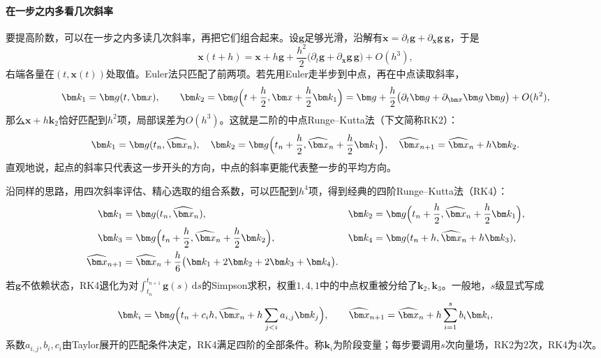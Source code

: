 \paragraph{在一步之内多看几次斜率}
要提高阶数，可以在一步之内多读几次斜率，再把它们组合起来。设$\bm g$足够光滑，沿解有$\ddot{\bm x}=\partial_t\bm g+\partial_{\bm x}\bm g\,\bm g$，于是
\[
  \bm x(t+h)=\bm x+h\bm g+\frac{h^2}2\bigl(\partial_t\bm g+\partial_{\bm x}\bm g\,\bm g\bigr)+O(h^3),
\]
右端各量在$(t,\bm x(t))$处取值。Euler法只匹配了前两项。若先用Euler走半步到中点，再在中点读取斜率，
\[
  \bm k_1=\bm g(t,\bm x),\qquad\bm k_2=\bm g\Bigl(t+\frac h2,\bm x+\frac h2\bm k_1\Bigr)=\bm g+\frac h2\bigl(\partial_t\bm g+\partial_{\bm x}\bm g\,\bm g\bigr)+O(h^2),
\]
那么$\bm x+h\bm k_2$恰好匹配到$h^2$项，局部误差为$O(h^3)$。这就是二阶的中点Runge--Kutta法（下文简称RK2）：
\begin{equation}
  \bm k_1=\bm g(t_n,\widehat{\bm x}_n),\quad
  \bm k_2=\bm g\Bigl(t_n+\frac h2,\widehat{\bm x}_n+\frac h2\bm k_1\Bigr),\quad
  \widehat{\bm x}_{n+1}=\widehat{\bm x}_n+h\bm k_2.
  \label{eq:ode-rk2}
\end{equation}
直观地说，起点的斜率只代表这一步开头的方向，中点的斜率更能代表整一步的平均方向。

沿同样的思路，用四次斜率评估、精心选取的组合系数，可以匹配到$h^4$项，得到经典的四阶Runge--Kutta法（RK4）：
\begin{equation}
  \begin{aligned}
    \bm k_1&=\bm g(t_n,\widehat{\bm x}_n),&
    \bm k_2&=\bm g\Bigl(t_n+\frac h2,\widehat{\bm x}_n+\frac h2\bm k_1\Bigr),\\
    \bm k_3&=\bm g\Bigl(t_n+\frac h2,\widehat{\bm x}_n+\frac h2\bm k_2\Bigr),&
    \bm k_4&=\bm g(t_n+h,\widehat{\bm x}_n+h\bm k_3),\\
    \widehat{\bm x}_{n+1}&=\widehat{\bm x}_n+\frac h6\bigl(\bm k_1+2\bm k_2+2\bm k_3+\bm k_4\bigr).
  \end{aligned}
  \label{eq:ode-rk4}
\end{equation}
若$\bm g$不依赖状态，RK4退化为对$\int_{t_n}^{t_{n+1}}\bm g(s)\,\mathrm ds$的Simpson求积，权重$1,4,1$中的中点权重被分给了$\bm k_2,\bm k_3$。一般地，$s$级显式写成
\[
  \bm k_i=\bm g\Bigl(t_n+c_ih,\widehat{\bm x}_n+h\sum_{j<i}a_{i,j}\bm k_j\Bigr),\qquad
  \widehat{\bm x}_{n+1}=\widehat{\bm x}_n+h\sum_{i=1}^sb_i\bm k_i,
\]
系数$a_{i,j},b_i,c_i$由Taylor展开的匹配条件决定，RK4满足四阶的全部条件。称$\bm k_i$为阶段变量；每步要调用$s$次向量场，RK2为$2$次，RK4为$4$次。

